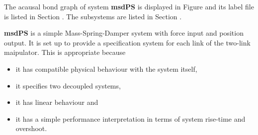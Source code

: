 

   The acausal bond graph of system \textbf{msdPS} is
   displayed in Figure  and its label
   file is listed in Section .
   The subsystems are listed in Section .


 \textbf{msdPS} is a simple Mass-Spring-Damper system with 
 force input and position output. It is set up to provide a specification system
 for each link of the two-link maipulator. This is appropriate because
 \begin{itemize}
 \item  it has compatible physical behaviour with the system itself,
 \item it specifies two decoupled systems,
 \item it has linear behaviour and
 \item it has a simple performance interpretation in terms of system
   rise-time and overshoot.
 \end{itemize}

